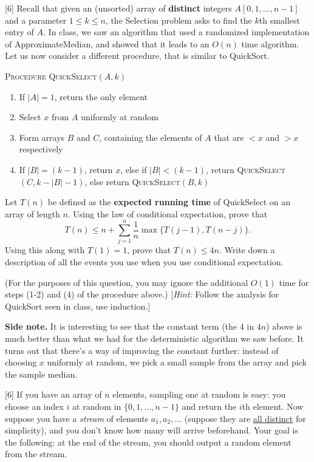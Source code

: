 \documentclass[addpoints, 11pt]{exam}
\begin{document}
\begin{questions}
[6]
Recall that given an (unsorted) array of {\bf distinct} integers $A[0, 1, \dots, n-1]$ and a parameter $1 \le k \le n$, the Selection problem asks to  find the $k$th smallest entry of $A$. In class, we saw an algorithm that used a randomized implementation of ApproximateMedian, and showed that it leads to an $O(n)$ time algorithm.  Let us now consider a different procedure, that is similar to QuickSort.

\textsc{Procedure QuickSelect}$(A, k)$
\begin{enumerate}
\item If $|A|=1$, return the only element
\item Select $x$ from $A$ uniformly at random
\item Form arrays $B$ and $C$, containing the elements of $A$ that are $<x$ and $>x$ respectively
\item If $|B| = (k-1)$, return $x$, else if $|B| < (k-1)$, return \textsc{QuickSelect}$(C, k-|B|-1)$, else return \textsc{QuickSelect}$(B, k)$
\end{enumerate}

Let $T(n)$ be defined as the {\bf expected running time} of QuickSelect on an array of length $n$. Using the law of conditional expectation, prove that
\[ T(n) \le n + \sum_{j=1}^n \frac{1}{n} \max \{ T(j-1), T(n-j)\}. \]
Using this along with $T(1) = 1$, prove that $T(n) \le 4n$.  Write down a description of all the events you use when you use conditional expectation.

(For the purposes of this question, you may ignore the additional $O(1)$ time for steps (1-2) and (4) of the procedure above.) [{\em Hint:} Follow the analysis for QuickSort seen in class, use induction.]

{\bf Side note.} It is interesting to see that the constant term (the 4 in $4n$) above is much better than what we had for the deterministic algorithm we saw before. It turns out that there's a way of improving the constant further: instead of choosing $x$ uniformly at random, we pick a small sample from the array and pick the sample median. 

[6]
If you have an array of $n$ elements, sampling one at random is easy: you choose an index $i$ at random in $\{0,1, \dots, n-1\}$ and return the $i$th element. Now suppose you have a {\em stream} of elements $a_1, a_2, \dots$ (suppose they are \underline{all distinct} for simplicity), and you don't know how many will arrive beforehand. Your goal is the following: at the end of the stream, you should output a random element from the stream. 


\end{questions}
\end{document}
